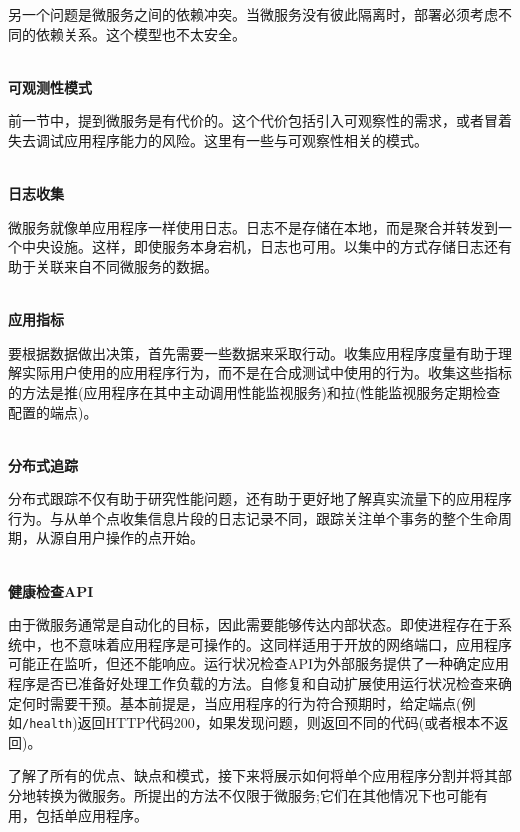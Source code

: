 另一个问题是微服务之间的依赖冲突。当微服务没有彼此隔离时，部署必须考虑不同的依赖关系。这个模型也不太安全。

\hspace*{\fill} \\ %
\noindent
\textbf{可观测性模式}

前一节中，提到微服务是有代价的。这个代价包括引入可观察性的需求，或者冒着失去调试应用程序能力的风险。这里有一些与可观察性相关的模式。

\hspace*{\fill} \\ %
\noindent
\textbf{日志收集}

微服务就像单应用程序一样使用日志。日志不是存储在本地，而是聚合并转发到一个中央设施。这样，即使服务本身宕机，日志也可用。以集中的方式存储日志还有助于关联来自不同微服务的数据。

\hspace*{\fill} \\ %
\noindent
\textbf{应用指标}

要根据数据做出决策，首先需要一些数据来采取行动。收集应用程序度量有助于理解实际用户使用的应用程序行为，而不是在合成测试中使用的行为。收集这些指标的方法是推(应用程序在其中主动调用性能监视服务)和拉(性能监视服务定期检查配置的端点)。

\hspace*{\fill} \\ %
\noindent
\textbf{分布式追踪}

分布式跟踪不仅有助于研究性能问题，还有助于更好地了解真实流量下的应用程序行为。与从单个点收集信息片段的日志记录不同，跟踪关注单个事务的整个生命周期，从源自用户操作的点开始。

\hspace*{\fill} \\ %
\noindent
\textbf{健康检查API}

由于微服务通常是自动化的目标，因此需要能够传达内部状态。即使进程存在于系统中，也不意味着应用程序是可操作的。这同样适用于开放的网络端口，应用程序可能正在监听，但还不能响应。运行状况检查API为外部服务提供了一种确定应用程序是否已准备好处理工作负载的方法。自修复和自动扩展使用运行状况检查来确定何时需要干预。基本前提是，当应用程序的行为符合预期时，给定端点(例如\texttt{/health})返回HTTP代码200，如果发现问题，则返回不同的代码(或者根本不返回)。

了解了所有的优点、缺点和模式，接下来将展示如何将单个应用程序分割并将其部分地转换为微服务。所提出的方法不仅限于微服务;它们在其他情况下也可能有用，包括单应用程序。















